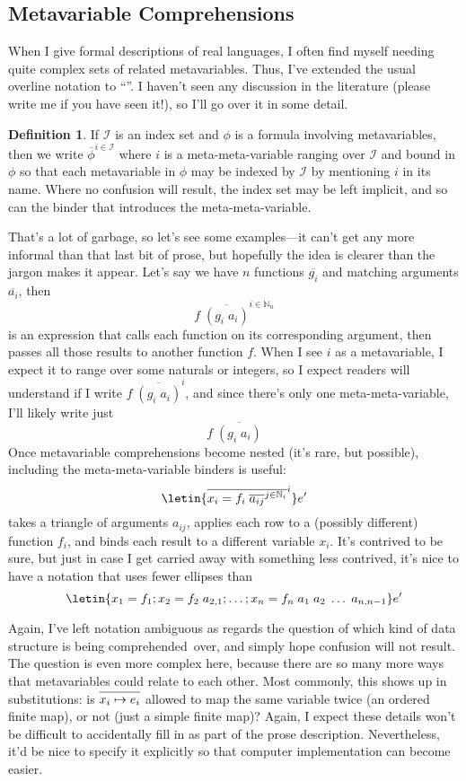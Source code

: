 \documentclass[11pt]{article} %
\theoremstyle{definition}
\newtheorem{definition}{Definition}
\theoremstyle{remark}
\begin{document}
\subsection{Metavariable Comprehensions}

When I give formal descriptions of real languages, I often find myself needing quite complex sets of related metavariables.
Thus, I've extended the usual overline notation to ``''.
I haven't seen any discussion in the literature (please write me if you have seen it!), so I'll go over it in some detail.

\begin{definition}
  If $\mathscr I$ is an index set and $\phi$ is a formula involving metavariables, then we write
    $\overline{\phi}^{i\in\mathscr I}$
  where $i$ is a meta-meta-variable ranging over $\mathscr I$ and bound in $\phi$ so that each metavariable in $\phi$ may be indexed by $\mathscr I$ by mentioning $i$ in its name.
  Where no confusion will result, the index set may be left implicit, and so can the binder that introduces the meta-meta-variable.
\end{definition}

That's a lot of garbage, so let's see some examples---it can't get any more informal than that last bit of prose, but hopefully the idea is clearer than the jargon makes it appear.
Let's say we have $n$ functions $\overline{g_i}$ and matching arguments $\overline{a_i}$, then
  $$f\;\overline{(g_i\;a_i)}^{i\in\mathbb N_n}$$
is an expression that calls each function on its corresponding argument, then passes all those results to another function $f$.
When I see $i$ as a metavariable, I expect it to range over some naturals or integers, so I expect readers will understand if I write $f\;\overline{(g_i\;a_i)}^{i}$, and since there's only one meta-meta-variable, I'll likely write just
  $$f\;\overline{(g_i\;a_i)}$$
Once metavariable comprehensions become nested (it's rare, but possible), including the meta-meta-variable binders is useful:
  $$\letin{\overline{x_i = f_i\;\overline{a_{ij}}^{j \in \mathbb N_i}}^i}e'$$
takes a triangle of arguments $a_{ij}$, applies each row to a (possibly different) function $f_i$, and binds each result to a different variable $x_i$.
It's contrived to be sure, but just in case I get carried away with something less contrived, it's nice to have a notation that uses fewer ellipses than
  $$\letin{x_1 = f_1; x_2 = f_2\;a_{2,1}; \ldots; x_n = f_n\;a_1\;a_2\;\ldots\;a_{n,n-1}}e'$$

Again, I've left notation ambiguous as regards the question of which kind of data structure is being comprehended~over, and simply hope confusion will not result.
The question is even more complex here, because there are so many more ways that metavariables could relate to each other.
Most commonly, this shows up in substitutions: is $\overline{\mathstrut x_i \mapsto e_i}$ allowed to map the same variable twice (an ordered finite map), or not (just a simple finite map)?
Again, I expect these details won't be difficult to accidentally fill in as part of the prose description.
Nevertheless, it'd be nice to specify it explicitly so that computer implementation can become easier.
\end{document}
